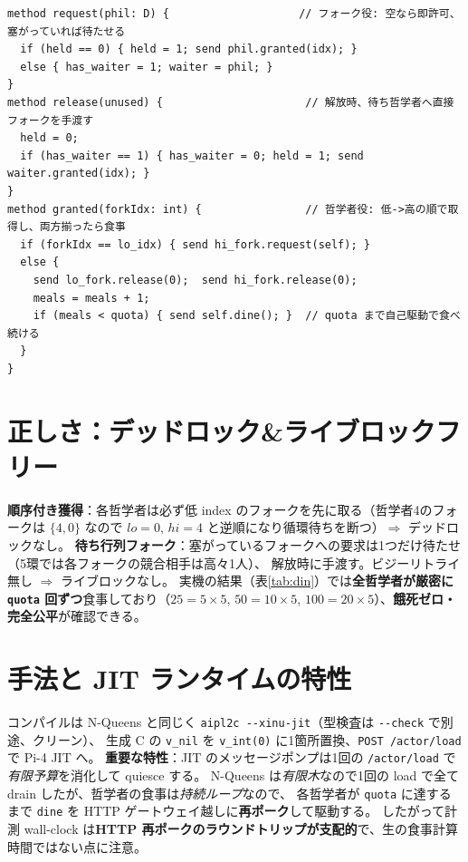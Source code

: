 \documentclass[11pt]{ltjsarticle}
\begin{document}
\begin{lstlisting}[caption={\texttt{dining\_xinu.abcl} の中核（待ち行列フォーク＋順序付き獲得）。}]
method request(phil: D) {                    // フォーク役: 空なら即許可、塞がっていれば待たせる
  if (held == 0) { held = 1; send phil.granted(idx); }
  else { has_waiter = 1; waiter = phil; }
}
method release(unused) {                      // 解放時、待ち哲学者へ直接フォークを手渡す
  held = 0;
  if (has_waiter == 1) { has_waiter = 0; held = 1; send waiter.granted(idx); }
}
method granted(forkIdx: int) {                // 哲学者役: 低->高の順で取得し、両方揃ったら食事
  if (forkIdx == lo_idx) { send hi_fork.request(self); }
  else {
    send lo_fork.release(0);  send hi_fork.release(0);
    meals = meals + 1;
    if (meals < quota) { send self.dine(); }  // quota まで自己駆動で食べ続ける
  }
}
\end{lstlisting}

\section{正しさ：デッドロック\&ライブロックフリー}
\textbf{順序付き獲得}：各哲学者は必ず低 index のフォークを先に取る（哲学者4のフォークは $\{4,0\}$ なので
$lo{=}0,\,hi{=}4$ と逆順になり循環待ちを断つ）$\Rightarrow$ デッドロックなし。
\textbf{待ち行列フォーク}：塞がっているフォークへの要求は1つだけ待たせ（5環では各フォークの競合相手は高々1人）、
解放時に手渡す。ビジーリトライ無し $\Rightarrow$ ライブロックなし。
実機の結果（表\ref{tab:din}）では\textbf{全哲学者が厳密に \texttt{quota} 回ずつ}食事しており（$25{=}5{\times}5$,
$50{=}10{\times}5$, $100{=}20{\times}5$）、\textbf{餓死ゼロ・完全公平}が確認できる。

\section{手法と JIT ランタイムの特性}
コンパイルは N-Queens と同じく \texttt{aipl2c -{}-xinu-jit}（型検査は \texttt{-{}-check} で別途、クリーン）、
生成 C の \texttt{v\_nil} を \texttt{v\_int(0)} に1箇所置換、\texttt{POST /actor/load} で Pi-4 JIT へ。
\textbf{重要な特性}：JIT のメッセージポンプは1回の \texttt{/actor/load} で\emph{有限予算}を消化して quiesce する。
N-Queens は\emph{有限木}なので1回の load で全て drain したが、哲学者の食事は\emph{持続ループ}なので、
各哲学者が \texttt{quota} に達するまで \texttt{dine} を HTTP ゲートウェイ越しに\textbf{再ポーク}して駆動する。
したがって計測 wall-clock は\textbf{HTTP 再ポークのラウンドトリップが支配的}で、生の食事計算時間ではない点に注意。
\end{document}
